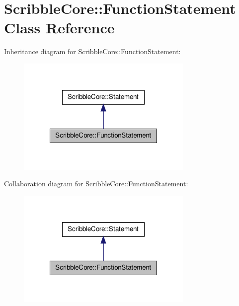 \hypertarget{class_scribble_core_1_1_function_statement}{\section{Scribble\-Core\-:\-:Function\-Statement Class Reference}
\label{class_scribble_core_1_1_function_statement}
}


Inheritance diagram for Scribble\-Core\-:\-:Function\-Statement\-:\nopagebreak
\begin{figure}[H]
\begin{center}
\leavevmode
\includegraphics[width=240pt]{class_scribble_core_1_1_function_statement__inherit__graph}
\end{center}
\end{figure}


Collaboration diagram for Scribble\-Core\-:\-:Function\-Statement\-:\nopagebreak
\begin{figure}[H]
\begin{center}
\leavevmode
\includegraphics[width=240pt]{class_scribble_core_1_1_function_statement__coll__graph}
\end{center}
\end{figure}
